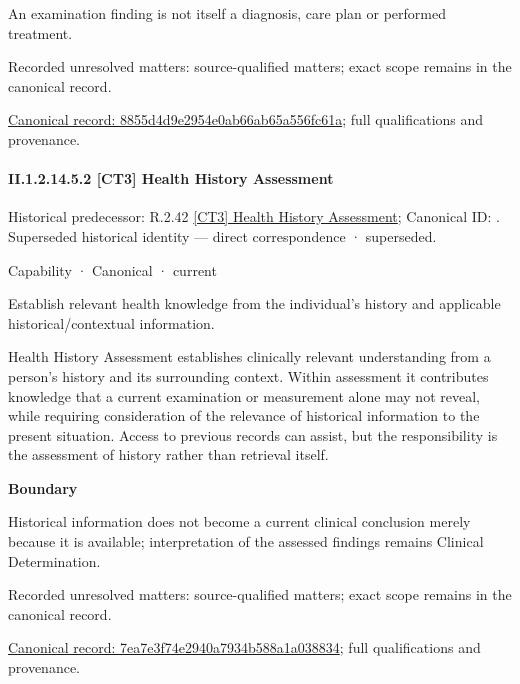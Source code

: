 An examination finding is not itself a diagnosis, care plan or performed treatment.


{\small Recorded unresolved matters: source-qualified matters; exact scope remains in the canonical record.}\par
{\footnotesize \href{../../../../continuum/strategy/capability/8855d4d9e2954e0ab66ab65a556fc61a.md}{Canonical record: 8855d4d9e2954e0ab66ab65a556fc61a}; full qualifications and provenance.}\par
\paragraph*{II.1.2.14.5.2 [CT3] Health History Assessment}
\label{navigation:II.1.2.14.5.2}

{\small Historical predecessor: R.2.42 \hyperref[element:bcaacf446f45443eafd8e21a1fd74ee1]{[CT3] Health History Assessment}; Canonical ID: \texttt{}. Superseded historical identity — direct correspondence · superseded.}\par
\label{element:7ea7e3f74e2940a7934b588a1a038834}
{\small Capability · Canonical · current}\par

Establish relevant health knowledge from the individual’s history and applicable historical/contextual information.



Health History Assessment establishes clinically relevant understanding from a person's history and its surrounding context. Within assessment it contributes knowledge that a current examination or measurement alone may not reveal, while requiring consideration of the relevance of historical information to the present situation. Access to previous records can assist, but the responsibility is the assessment of history rather than retrieval itself.



\textbf{Boundary}



Historical information does not become a current clinical conclusion merely because it is available; interpretation of the assessed findings remains Clinical Determination.


{\small Recorded unresolved matters: source-qualified matters; exact scope remains in the canonical record.}\par
{\footnotesize \href{../../../../continuum/strategy/capability/7ea7e3f74e2940a7934b588a1a038834.md}{Canonical record: 7ea7e3f74e2940a7934b588a1a038834}; full qualifications and provenance.}\par
